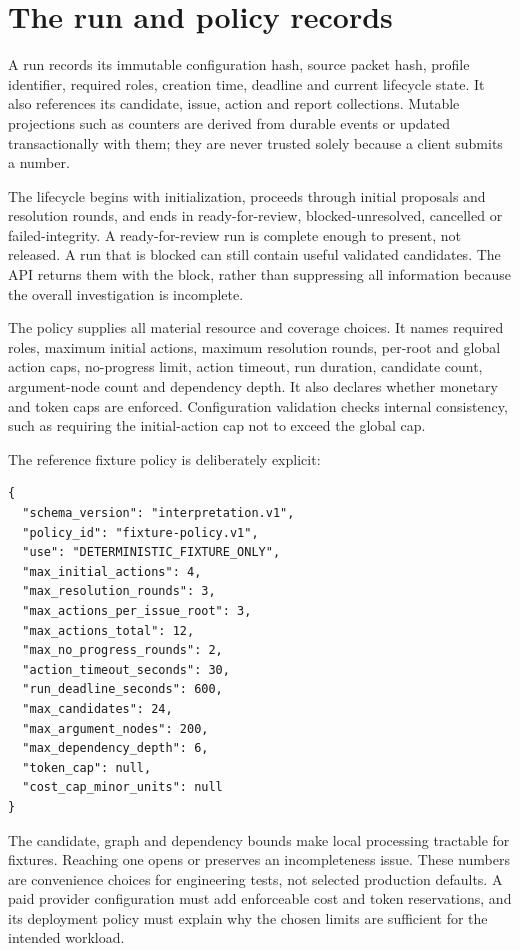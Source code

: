 \documentclass[12pt,a4paper,oneside,openany]{book}
\begin{document}
\section{The run and policy records}
\label{merge:M08:02}


A run records its immutable configuration hash, source packet hash, profile
identifier, required roles, creation time, deadline and current lifecycle state.
It also references its candidate, issue, action and report collections. Mutable
projections such as counters are derived from durable events or updated
transactionally with them; they are never trusted solely because a client submits
a number.

The lifecycle begins with initialization, proceeds through initial proposals and
resolution rounds, and ends in ready-for-review, blocked-unresolved, cancelled or
failed-integrity. A ready-for-review run is complete enough to present, not
released. A run that is blocked can still contain useful validated candidates.
The API returns them with the block, rather than suppressing all information
because the overall investigation is incomplete.

The policy supplies all material resource and coverage choices. It names required
roles, maximum initial actions, maximum resolution rounds, per-root and global
action caps, no-progress limit, action timeout, run duration, candidate count,
argument-node count and dependency depth. It also declares whether monetary and
token caps are enforced. Configuration validation checks internal consistency,
such as requiring the initial-action cap not to exceed the global cap.

The reference fixture policy is deliberately explicit:
\begin{lstlisting}[caption={Reference limits for deterministic controller fixtures.}]
{
  "schema_version": "interpretation.v1",
  "policy_id": "fixture-policy.v1",
  "use": "DETERMINISTIC_FIXTURE_ONLY",
  "max_initial_actions": 4,
  "max_resolution_rounds": 3,
  "max_actions_per_issue_root": 3,
  "max_actions_total": 12,
  "max_no_progress_rounds": 2,
  "action_timeout_seconds": 30,
  "run_deadline_seconds": 600,
  "max_candidates": 24,
  "max_argument_nodes": 200,
  "max_dependency_depth": 6,
  "token_cap": null,
  "cost_cap_minor_units": null
}
\end{lstlisting}

The candidate, graph and dependency bounds make local processing tractable for
fixtures. Reaching one opens or preserves an incompleteness issue. These numbers
are convenience choices for engineering tests, not selected production defaults.
A paid provider configuration must add enforceable cost and token reservations,
and its deployment policy must explain why the chosen limits are sufficient for
the intended workload.
\end{document}
